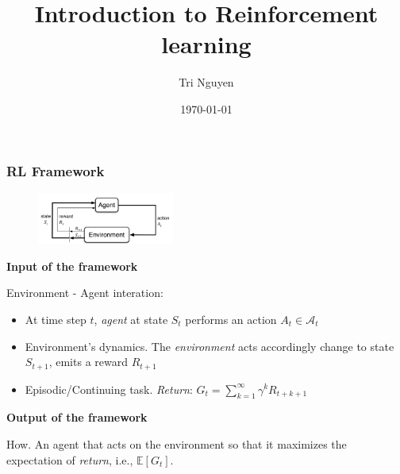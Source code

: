 \documentclass[10pt]{beamer}
\title[Introduction to Reinforcement learning]{Introduction to Reinforcement learning} %
\author{Tri Nguyen} %
\institute[OSU] %
{
Summer Reading 2021 - Oregon State University \\ %
}
\date{\today} %
\theoremstyle{remark}
\begin{document}
\begin{frame}
\titlepage %
\end{frame}




\begin{frame}
    \frametitle{RL Framework}
    \begin{figure}
        \includegraphics[width=0.4\textwidth]{figures/agent-environment.png}
   \end{figure}
   \textbf{Input of the framework}

   Environment - Agent interation:
   \begin{itemize}
       \item At time step $t$, \textit{agent} at state $S_t$ performs an action $A_t \in \mathcal{A}_t$
       \item { Environment's dynamics.} The \textit{environment} acts accordingly change to state $S_{t+1}$, emits a reward $R_{t+1}$
       \item { Episodic/Continuing task.} \textit{Return}: $G_t = \sum^{\infty}_{k=1} \gamma^{k}R_{t+k+1}$
   \end{itemize}
   \textbf{Output of the framework}

   {\color{blue} How.} An agent that acts on the environment so that it maximizes the expectation of \textit{return}, i.e., $ \mathbb{E}[G_t]$.
\end{frame}
\end{document}
